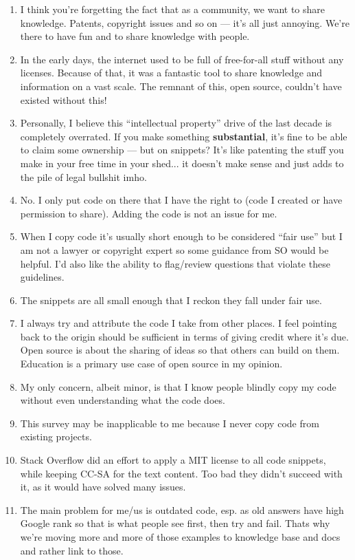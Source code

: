 \documentclass{svjour3}                     %
\begin{document}
\begin{enumerate}
	\item I think you're forgetting the fact that as a community, we want to share knowledge. Patents, copyright issues and so on --- it's all just annoying. We're there to have fun and to share knowledge with people. 
	\item In the early days, the internet used to be full of free-for-all stuff without any licenses. Because of that, it was a fantastic tool to share knowledge and information on a vast scale. The remnant of this, open source, couldn't have existed without this!
	\item Personally, I believe this ``intellectual property'' drive of the last decade is completely overrated. If you make something \textbf{substantial}, it's fine to be able to claim some ownership --- but on snippets? It's like patenting the stuff you make in your free time in your shed... it doesn't make sense and just adds to the pile of legal bullshit imho.
	\item No. I only put code on there that I have the right to (code I created or have permission to share). Adding the code is not an issue for me.
	\item When I copy code it's usually short enough to be considered ``fair use'' but I am not a lawyer or copyright expert so some guidance from SO would be helpful. I'd also like the ability to flag/review questions that violate these guidelines.
	\item The snippets are all small enough that I reckon they fall under fair use.
	\item I always try and attribute the code I take from other places. I feel pointing back to the origin should be sufficient in terms of giving credit where it's due. Open source is about the sharing of ideas so that others can build on them. Education is a primary use case of open source in my opinion.
	\item My only concern, albeit minor, is that I know people blindly copy my code without even understanding what the code does.
	\item This survey may be inapplicable to me because I never copy code from existing projects.
	\item Stack Overflow did an effort to apply a MIT license to all code snippets, while keeping CC-SA for the text content. Too bad they didn't succeed with it, as it would have solved many issues.
	\item The main problem for me/us is outdated code, esp. as old answers have high Google rank so that is what people see first, then try and fail. Thats why we're moving more and more of those examples to knowledge base and docs and rather link to those.

\end{enumerate}
\end{document}
